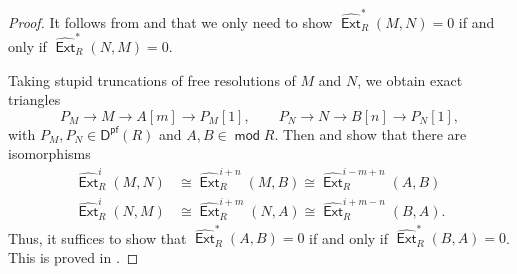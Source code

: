 \documentclass[10pt, a4paper,reqno]{amsart}
\theoremstyle{definition}
\theoremstyle{remark}
\numberwithin{equation}{thm}
\def\Ext{\operatorname{\mathsf{Ext}}}
\def\mod{\operatorname{\mathsf{mod}}}
\def\Pf{\mathsf{D^{pf}}}
\begin{document}
\begin{proof}
It follows from \cite[(2.4.1) and (4.1.1)]{CJ} and  that we only need to show $\widehat{\Ext}_R^{*}(M,N)=0$ if and only if $\widehat{\Ext}_R^{*}(N,M)=0$.

Taking stupid truncations of free resolutions of $M$ and $N$, we obtain exact triangles
\[
P_M\to M\to A[m]\to P_M[1],
\qquad
P_N\to N\to B[n]\to P_N[1],
\]
with $P_M,P_N \in \Pf(R)$ and $A,B \in \mod R$.
Then \cite[Theorem 4.5]{Vel} and  show that there are isomorphisms
\begin{align*}
\widehat{\Ext}_R^i(M,N) &\cong \widehat{\Ext}_R^{i+n}(M,B) \cong \widehat{\Ext}_R^{i-m+n}(A,B) \\
\widehat{\Ext}_R^i(N,M) &\cong \widehat{\Ext}_R^{i+m}(N,A) \cong \widehat{\Ext}_R^{i+m-n}(B,A).
\end{align*}
Thus, it suffices to show that $\widehat{\Ext}_R^{*}(A,B)=0$ if and only if $\widehat{\Ext}_R^{*}(B,A)=0$.
This is proved in \cite[Corollary 3.5(ii)]{Sad}.
\end{proof}
\end{document}

